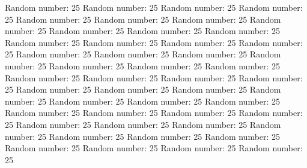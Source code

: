 \documentclass{article}%
\begin{document}
%
Random number: 25\newline%
%
Random number: 25\newline%
%
Random number: 25\newline%
%
Random number: 25\newline%
%
Random number: 25\newline%
%
Random number: 25\newline%
%
Random number: 25\newline%
%
Random number: 25\newline%
%
Random number: 25\newline%
%
Random number: 25\newline%
%
Random number: 25\newline%
%
Random number: 25\newline%
%
Random number: 25\newline%
%
Random number: 25\newline%
%
Random number: 25\newline%
%
Random number: 25\newline%
%
Random number: 25\newline%
%
Random number: 25\newline%
%
Random number: 25\newline%
%
Random number: 25\newline%
%
Random number: 25\newline%
%
Random number: 25\newline%
%
Random number: 25\newline%
%
Random number: 25\newline%
%
Random number: 25\newline%
%
Random number: 25\newline%
%
Random number: 25\newline%
%
Random number: 25\newline%
%
Random number: 25\newline%
%
Random number: 25\newline%
%
Random number: 25\newline%
%
Random number: 25\newline%
%
Random number: 25\newline%
%
Random number: 25\newline%
%
Random number: 25\newline%
%
Random number: 25\newline%
%
Random number: 25\newline%
%
Random number: 25\newline%
%
Random number: 25\newline%
%
Random number: 25\newline%
%
Random number: 25\newline%
%
Random number: 25\newline%
%
Random number: 25\newline%
%
Random number: 25\newline%
%
Random number: 25\newline%
%
Random number: 25\newline%
%
Random number: 25\newline%
%
Random number: 25\newline%
%
\end{document}
